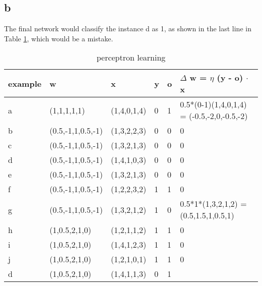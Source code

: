 \documentclass[12pt]{article}
\begin{document}
\subsection{b}
The final network would classify the instance d as 1, as shown in the last line in Table \ref{tab:perceptron}, which would be a mistake.
\begin{table}[htb]
  \centering
  \begin{tabularx}{\textwidth}{|l|l|l|l|l|X|} \hline
    example & w & x & y & o & $\Delta$ w = $\eta$ (y - o) $\cdot$ x \\ \hline
    a & (1,1,1,1,1) & (1,4,0,1,4) & 0 & 1 & 0.5*(0-1)(1,4,0,1,4) = (-0.5,-2,0,-0.5,-2) \\ \hline
    b & (0.5,-1,1,0.5,-1) & (1,3,2,2,3) & 0 & 0 & 0 \\ \hline
    c & (0.5,-1,1,0.5,-1) & (1,3,2,1,3) & 0 & 0 & 0 \\ \hline
    d & (0.5,-1,1,0.5,-1) & (1,4,1,0,3) & 0 & 0 & 0 \\ \hline
    e & (0.5,-1,1,0.5,-1) & (1,3,2,1,3) & 0 & 0 & 0 \\ \hline
    f & (0.5,-1,1,0.5,-1) & (1,2,2,3,2) & 1 & 1 & 0 \\ \hline
    g & (0.5,-1,1,0.5,-1) & (1,3,2,1,2) & 1 & 0 & 0.5*1*(1,3,2,1,2) = (0.5,1.5,1,0.5,1) \\ \hline
    h & (1,0.5,2,1,0) & (1,2,1,1,2) & 1 & 1 & 0 \\ \hline
    i & (1,0.5,2,1,0) & (1,4,1,2,3) & 1 & 1 & 0 \\ \hline
    j & (1,0.5,2,1,0) & (1,2,1,0,1) & 1 & 1 & 0 \\ \hline
    d & (1,0.5,2,1,0) & (1,4,1,1,3) & 0 & 1 & \\ \hline
  \end{tabularx}
  \caption{perceptron learning}
  \label{tab:perceptron}
\end{table}
\end{document}
